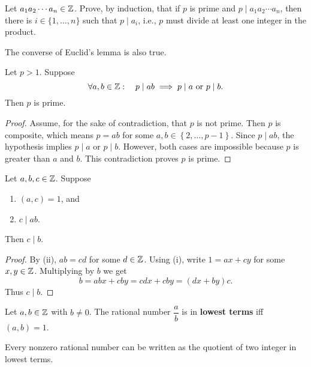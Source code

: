 \documentclass[11pt,a4paper]{article}
\begin{document}
\begin{eje}
    Let \(a_1 a_2 \cdots a_n\in \mathbb{Z}\).
    Prove, by induction, that if \(p\) is prime and \(p\mid a_1 a_2 \cdots a_n\), then there is \(i\in \{1,\ldots,n\}\) such that \(p\mid a_i\), i.e., \(p\) must divide at least one integer in the product.
\end{eje}

The converse of Euclid's lemma is also true.

\begin{prop}
    Let \(p>1\).
    Suppose
    \[\forall a,b\in \mathbb{Z}  :\quad p\mid ab\implies p\mid a \text{  or  } p\mid b.\]
    Then \(p\) is prime.
\end{prop}

\begin{proof}
    Assume, for the sake of contradiction, that \(p\) is not prime.
    Then \(p\) is composite, which means \(p=ab\) for some \(a,b\in \left\{ 2,\ldots, p-1 \right\}\).
    Since \(p\mid ab\), the hypothesis implies \(p\mid a\) or \(p\mid b\).
    However, both cases are impossible because \(p\) is greater than \(a\) and \(b\).
    This contradiction proves \(p\) is prime.
\end{proof}


\begin{prop}
    Let \(a,b,c\in \mathbb{Z}\).
    Suppose
    \begin{enumerate}[label=(\roman*)]
        \item \((a,c) = 1\), and
        \item \(c\mid ab\).
    \end{enumerate}
    Then \(c\mid b\).
\end{prop}


\begin{proof}
    By (ii), \(ab=cd\) for some \(d\in\mathbb{Z}\).
    Using (i), write \(1 = ax+cy\) for some \(x,y\in \mathbb{Z}\). Multiplying by \(b\) we get 
    \[b = abx + cby = cdx + cby = (dx + by)c.\]
    Thus \(c\mid b\).
\end{proof}



\begin{defi}
    Let \(a,b\in \mathbb{Z}\) with \(b\neq 0\). The rational number  \(\dfrac{a}{b}    \) is in \textbf{lowest terms} iff \((a,b) = 1\).
\end{defi}

\begin{lem}
    Every nonzero rational number can be written as the quotient of two integer  in lowest terms.
\end{lem}
\end{document}
